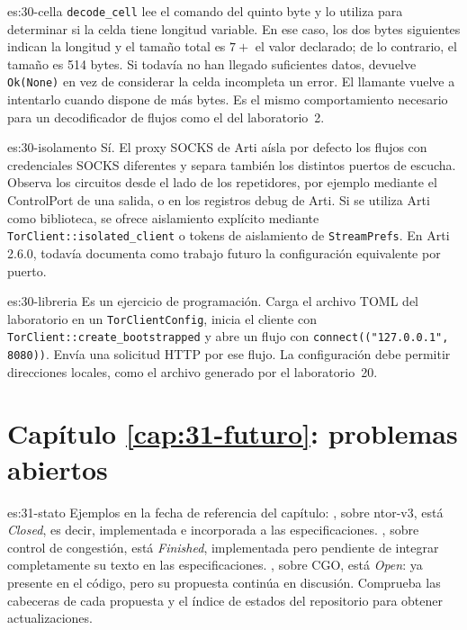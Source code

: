 \begin{soluzione}{es:30-cella}
\texttt{decode\_cell} lee el comando del quinto byte y lo utiliza para determinar si la celda tiene longitud variable. En ese caso, los dos bytes siguientes indican la longitud y el tamaño total es $7+$ el valor declarado; de lo contrario, el tamaño es 514 bytes. Si todavía no han llegado suficientes datos, devuelve \texttt{Ok(None)} en vez de considerar la celda incompleta un error. El llamante vuelve a intentarlo cuando dispone de más bytes. Es el mismo comportamiento necesario para un decodificador de flujos como el del laboratorio~2.
\end{soluzione}

\begin{soluzione}{es:30-isolamento}
Sí. El proxy SOCKS de Arti aísla por defecto los flujos con credenciales SOCKS diferentes y separa también los distintos puertos de escucha. Observa los circuitos desde el lado de los repetidores, por ejemplo mediante el ControlPort de una salida, o en los registros debug de Arti. Si se utiliza Arti como biblioteca, se ofrece aislamiento explícito mediante \texttt{TorClient::isolated\_client} o tokens de aislamiento de \texttt{StreamPrefs}. En Arti 2.6.0,  todavía documenta como trabajo futuro la configuración equivalente por puerto.
\end{soluzione}

\begin{soluzione}{es:30-libreria}
Es un ejercicio de programación. Carga el archivo TOML del laboratorio en un \texttt{TorClientConfig}, inicia el cliente con \texttt{TorClient::create\_bootstrapped} y abre un flujo con \texttt{connect(("127.0.0.1", 8080))}. Envía una solicitud HTTP por ese flujo. La configuración debe permitir direcciones locales, como el archivo generado por el laboratorio~20.
\end{soluzione}

\section*{Capítulo \ref{cap:31-futuro}: problemas abiertos}

\begin{soluzione}{es:31-stato}
Ejemplos en la fecha de referencia del capítulo: , sobre ntor-v3, está \emph{Closed}, es decir, implementada e incorporada a las especificaciones. , sobre control de congestión, está \emph{Finished}, implementada pero pendiente de integrar completamente su texto en las especificaciones. , sobre CGO, está \emph{Open}: ya presente en el código, pero su propuesta continúa en discusión. Comprueba las cabeceras de cada propuesta y el índice de estados del repositorio para obtener actualizaciones.
\end{soluzione}

